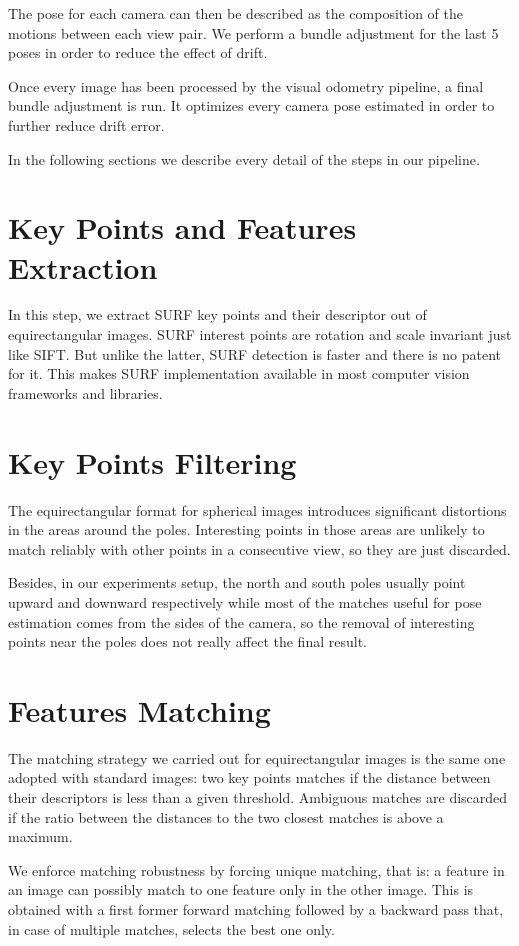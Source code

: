 The pose for each camera can then be described as the composition of the 
motions between each view pair. We perform a bundle adjustment for the last 5 
poses in order to reduce the effect of drift.

Once every image has been processed by the visual odometry pipeline, a final 
bundle adjustment is run. It optimizes every camera pose estimated in order to 
further reduce drift error.

In the following sections we describe every detail of the steps in our pipeline.

\section{Key Points and Features Extraction}
In this step, we extract SURF key points and their descriptor out of 
equirectangular images. SURF 
interest points are rotation and scale invariant just like SIFT. But unlike 
the latter, SURF detection is faster and there is no patent for it. 
This makes SURF implementation available in most computer vision frameworks and 
libraries.

\section{Key Points Filtering}
The equirectangular format for spherical images introduces significant 
distortions in the areas around the poles. Interesting points in those areas 
are unlikely to match reliably with other points in a consecutive view, 
so they are just discarded.

Besides, in our experiments setup, the north and south poles usually point 
upward and downward respectively while most of the matches useful for pose 
estimation comes from the sides of the camera, so the removal of interesting 
points near the poles does not really affect the final result.

\section{Features Matching}
The matching strategy we carried out for equirectangular images is the same one 
adopted with standard images: two key points matches if the distance between 
their descriptors is less than a given threshold. Ambiguous matches 
are discarded if the ratio between the distances to the two closest matches is 
above a maximum.

We enforce matching robustness by forcing unique matching, that is: a feature 
in an image can possibly match to one feature only in the other image.
This is obtained with a first former forward matching followed by a backward 
pass that, in case of multiple matches, selects the best one only.


